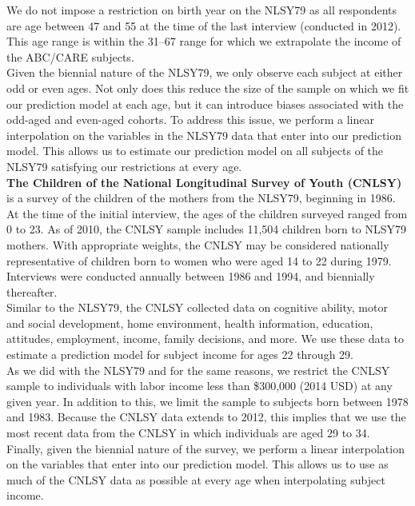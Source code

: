 \noindent We do not impose a restriction on birth year on the NLSY79 as all respondents are age between 47 and 55 at the time of the last interview (conducted in 2012). This age range is within the 31--67 range for which we extrapolate the income of the ABC/CARE subjects. \\

\noindent Given the biennial nature of the NLSY79, we only observe each subject at either odd or even ages. Not only does this reduce the size of the sample on which we fit our prediction model at each age, but it can introduce biases associated with the odd-aged and even-aged cohorts. To address this issue, we perform a linear interpolation on the variables in the NLSY79 data that enter into our prediction model. This allows us to estimate our prediction model on all subjects of the NLSY79 satisfying our restrictions at every age. \\

\noindent \textbf{The Children of the National Longitudinal Survey of Youth (CNLSY)} is a survey of the children of the mothers from the NLSY79, beginning in 1986. At the time of the initial interview, the ages of the children surveyed ranged from 0 to 23. As of 2010, the CNLSY sample includes 11,504 children born to NLSY79 mothers. With appropriate weights, the CNLSY may be considered nationally representative of children born to women who were aged 14 to 22 during 1979. Interviews were conducted annually between 1986 and 1994, and biennially thereafter. \\

\noindent Similar to the NLSY79, the CNLSY collected data on cognitive ability, motor and social development, home environment, health information, education, attitudes, employment, income, family decisions, and more. We use these data to estimate a prediction model for subject income for ages 22 through 29. \\

\noindent As we did with the NLSY79 and for the same reasons, we restrict the CNLSY sample to individuals with labor income less than \$300,000 (2014 USD) at any given year. In addition to this, we limit the sample to subjects born between 1978 and 1983. Because the CNLSY data extends to 2012, this implies that we use the most recent data from the CNLSY in which individuals are aged 29 to 34. Finally, given the biennial nature of the survey, we perform a linear interpolation on the variables that enter into our prediction model. This allows us to use as much of the CNLSY data as possible at every age when interpolating subject income. \\

